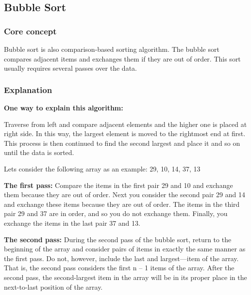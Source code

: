 \subsection{Bubble Sort}

\subsubsection{Core concept}
Bubble sort is also comparison-based sorting algorithm. The bubble sort compares adjacent items and exchanges them if they are out of order. This sort usually requires several passes over the data. ~\cite{ref7}

\vspace{5pt}

\subsubsection{Explanation}
\textbf{One way to explain this algorithm:}

Traverse from left and compare adjacent elements and the higher one is placed at right side. In this way, the largest element is moved to the rightmost end at first. This process is then continued to find the second largest and place it and so on until the data is sorted. ~\cite{ref9}

\vspace{5pt}

Lets consider the following array as an example: {29, 10, 14, 37, 13} ~\cite{ref7} 

\vspace{5pt}

\textbf{The first pass: }
Compare the items in the first pair 29 and 10 and exchange them because they are out of order. Next you consider the second pair 29 and 14 and exchange these items because they are out of order. The items in the third pair 29 and 37 are in order, and so you do not exchange them. Finally, you exchange the items in the last pair 37 and 13.

\vspace{5pt}

\textbf{The second pass:}
During the second pass of the bubble sort, return to the beginning of the array and consider pairs of items in exactly the same manner as the first pass. Do not, however, include the last and largest—item of the array. That is, the second pass considers the first n – 1 items of the array. After the second pass, the second-largest item in the array will be in its proper place in the next-to-last position of the array.

